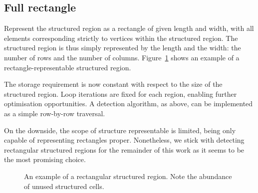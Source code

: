 \subsection{Full rectangle}

Represent the structured region as a rectangle of given length and width, with all elements corresponding strictly to vertices within the structured region. The structured region is thus simply represented by the length and the width: the number of rows and the number of columns. Figure~\ref{fig:rectangle} shows an example of a rectangle-representable structured region.

The storage requirement is now constant with respect to the size of the structured region.
Loop iterations are fixed for each region, enabling further optimisation opportunities.
A detection algorithm, as above, can be implemented as a simple row-by-row traversal.

On the downside, the scope of structure representable is limited, being only capable of representing rectangles proper. Nonetheless, we stick with detecting rectangular structured regions for the remainder of this work as it seems to be the most promising choice.

\begin{figure}
\drawmatrix[cell wd=0.8, cell ht=0.8]{\bitmapmatrix}
\caption{An example of a rectangular structured region. Note the abundance of unused structured cells.}
\label{fig:rectangle}
\end{figure}